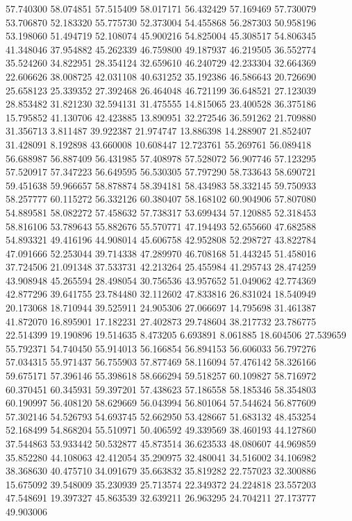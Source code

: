 57.740300
58.074851
57.515409
58.017171
56.432429
57.169469
57.730079
53.706870
52.183320
55.775730
52.373004
54.455868
56.287303
50.958196
53.198060
51.494719
52.108074
45.900216
54.825004
45.308517
54.806345
41.348046
37.954882
45.262339
46.759800
49.187937
46.219505
36.552774
35.524260
34.822951
28.354124
32.659610
46.240729
42.233304
32.664369
22.606626
38.008725
42.031108
40.631252
35.192386
46.586643
20.726690
25.658123
25.339352
27.392468
26.464048
46.721199
36.648521
27.123039
28.853482
31.821230
32.594131
31.475555
14.815065
23.400528
36.375186
15.795852
41.130706
42.423885
13.890951
32.272546
36.591262
21.709880
31.356713
3.811487
39.922387
21.974747
13.886398
14.288907
21.852407
31.428091
8.192898
43.660008
10.608447
12.723761
55.269761
56.089418
56.688987
56.887409
56.431985
57.408978
57.528072
56.907746
57.123295
57.520917
57.347223
56.649595
56.530305
57.797290
58.733643
58.690721
59.451638
59.966657
58.878874
58.394181
58.434983
58.332145
59.750933
58.257777
60.115272
56.332126
60.380407
58.168102
60.904906
57.807080
54.889581
58.082272
57.458632
57.738317
53.699434
57.120885
52.318453
58.816106
53.789643
55.882676
55.570771
47.194493
52.655660
47.682588
54.893321
49.416196
44.908014
45.606758
42.952808
52.298727
43.822784
47.091666
52.253044
39.714338
47.289970
46.708168
51.443245
51.458016
37.724506
21.091348
37.533731
42.213264
25.455984
41.295743
28.474259
43.908948
45.265594
28.498054
30.756536
43.957652
51.049062
42.774369
42.877296
39.641755
23.784480
32.112602
47.833816
26.831024
18.540949
20.173068
18.710944
39.525911
24.905306
27.066697
14.795698
31.461387
41.872070
16.895901
17.182231
27.402873
29.748604
38.217732
23.786775
22.514399
19.190896
19.514635
8.473205
6.693891
8.061885
18.604506
27.539659
55.792371
54.740450
55.914013
56.166854
56.894153
56.606033
56.797276
57.034315
55.971437
56.755903
57.877469
58.116094
57.476142
58.326166
59.675171
57.396146
55.398618
58.666294
59.518257
60.109827
58.716972
60.370451
60.345931
59.397201
57.438623
57.186558
58.185346
58.354803
60.190997
56.408120
58.629669
56.043994
56.801064
57.544624
56.877609
57.302146
54.526793
54.693745
52.662950
53.428667
51.683132
48.453254
52.168499
54.868204
55.510971
50.406592
49.339569
38.460193
44.127860
37.544863
53.933442
50.532877
45.873514
36.623533
48.080607
44.969859
35.852280
44.108063
42.412054
35.290975
32.480041
34.516002
34.106982
38.368630
40.475710
34.091679
35.663832
35.819282
22.757023
32.300886
15.675092
39.548009
35.230939
25.713574
22.349372
24.224818
23.557203
47.548691
19.397327
45.863539
32.639211
26.963295
24.704211
27.173777
49.903006
